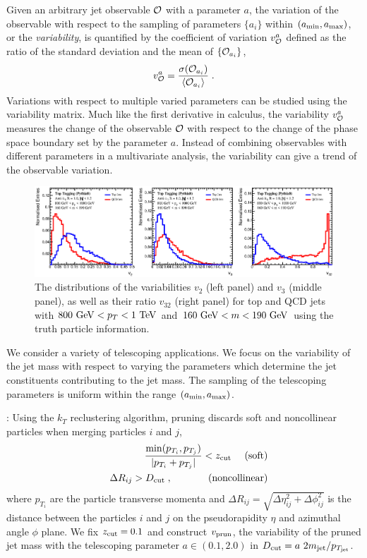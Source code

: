 \documentclass[aps,prl,floatfix,preprintnumbers,twocolumn,groupedaddress,nofootinbib]{revtex4-1}
\newcommand{\be}{\begin{equation}}
\newcommand{\ee}{\end{equation}}
\newcommand{\bea}{\begin{eqnarray}}
\newcommand{\eea}{\end{eqnarray}}
\begin{document}
Given an arbitrary jet observable $\cal O$ with a parameter $a$,
the variation of the observable with respect to the sampling of parameters $\{a_i\}$ within $(a_{\rm min},a_{\rm max})$, or the {\sl variability}, is quantified by the coefficient of variation $v_{\cal O}^a$ defined as the ratio of the standard deviation and the mean of $\{{\cal O}_{a_i}\}$,
\be
    v_{\cal O}^a = \frac{\sigma({\cal O}_{a_i})}{\langle {\cal O}_{a_i}\rangle}\;.
\ee
Variations with respect to multiple varied parameters can be studied using the variability matrix. Much like the first derivative in calculus, the variability $v_{\cal O}^a$ measures the change of the observable $\cal O$ with respect to the change of the phase space boundary set by the parameter $a$. Instead of combining observables with different parameters in a multivariate analysis, the variability can give a trend of the observable variation.

\begin{figure}
    \includegraphics[width=2\columnwidth]{plots/Top_vs_high.eps}
    \caption{The distributions of the variabilities $v_2$ (left panel) and $v_3$ (middle panel), as well as their ratio $v_{32}$ (right panel) for top and QCD jets with $800~{\rm GeV} < p_T < 1~{\rm TeV}$ and $160~{\rm GeV} < m < 190~{\rm GeV}$ using the truth particle information.}
\label{v32}
\end{figure}

We consider a variety of telescoping applications. We focus on the variability of the jet mass with respect to varying the parameters which determine the jet constituents contributing to the jet mass. %
The sampling of the telescoping parameters is uniform within the range $(a_{\rm min},a_{\rm max})$. %

: Using the $k_T$ reclustering algorithm, pruning discards soft and noncollinear particles when %
merging particles $i$ and $j$,
\bea
    &&\frac{{\rm min}(p_{T_i},p_{T_j})}{|p_{T_i}+p_{T_j}|}<z_{\rm cut}~~~~{\rm (soft)}\nonumber\\
    &&\Delta R_{ij} > D_{\rm cut}\;,~~~~~~~~~~~{\rm (noncollinear)}
\eea
where $p_{T_i}$ are the particle transverse momenta and $\Delta R_{ij}=\sqrt{\Delta \eta_{ij}^2+\Delta \phi_{ij}^2}$ is the distance between the particles $i$ and $j$ on the pseudorapidity $\eta$ and azimuthal angle $\phi$ plane. We fix $z_{\rm cut}=0.1$ and construct $v_{\rm prun}$, the variability of the pruned jet mass with the telescoping parameter $a\in (0.1, 2.0)$ in $D_{\rm cut} = a~ 2m_{\rm jet}/p_{T_{\rm jet}}$. %
\end{document}
